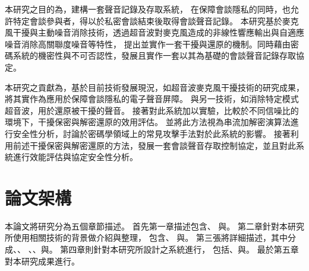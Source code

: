     本研究之目的為，建構一套聲音記錄及存取系統，
在保障會談隱私的同時，也允許特定會談參與者，得以於私密會談結束後取得會談聲音記錄。
本研究基於麥克風干擾與主動噪音消除技術，透過超音波對麥克風造成的非線性響應輸出與自適應噪音消除高關聯度噪音等特性，
提出並實作一套干擾與還原的機制。同時藉由密碼系統的機密性與不可否認性，發展且實作一套以其為基礎的會談聲音記錄存取協定。

本研究之貢獻為，基於目前技術發展現況，如超音波麥克風干擾技術的研究成果，將其實作為應用於保障會談隱私的電子聲音屏障。
與另一技術，如消除特定模式超音波，用於還原被干擾的聲音。
接著對此系統加以實驗，比較於不同信噪比的環境下，干擾保密與解密還原的效用評估。
並將此方法視為串流加解密演算法進行安全性分析，討論於密碼學領域上的常見攻擊手法對於此系統的影響。
接著利用前述干擾保密與解密還原的方法，發展一套會談聲音存取控制協定，並且對此系統進行效能評估與協定安全性分析。


\section{論文架構}\label{section:intro-arch}

    本論文將研究分為五個章節描述。
首先第一章描述包含、
與。
第二章針對本研究所使用相關技術的背景做介紹與整理，
包含、
與。
第三張將詳細描述，其中分成、、
、、與。
第四章則針對本研究所設計之系統進行，
包括、與。
最於第五章對本研究成果進行。